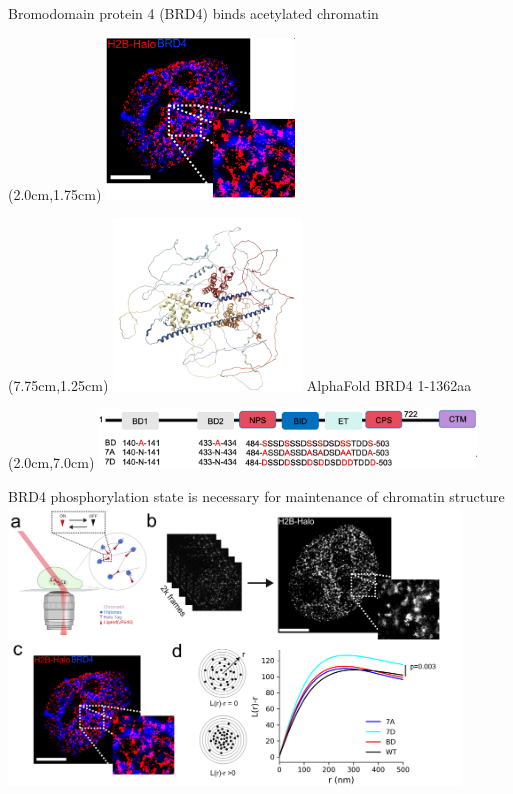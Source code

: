 \documentclass{beamer}					%
\begin{document}
\begin{frame}{Bromodomain protein 4 (BRD4) binds acetylated chromatin}

\begin{textblock*}{5cm}(2.0cm,1.75cm)
\includegraphics[width=5cm]{media/TwoColor}
\end{textblock*}

\begin{textblock*}{5cm}(7.75cm,1.25cm)
\includegraphics[width=5cm]{media/BRD4-Structure}
\;\; AlphaFold BRD4 1-1362aa 
\end{textblock*}

\begin{textblock*}{10cm}(2.0cm,7.0cm)
\includegraphics[width=10cm]{media/Mutations}
\end{textblock*}

\end{frame}


\begin{frame}{BRD4 phosphorylation state is necessary for maintenance of chromatin structure}
\includegraphics[width=12cm]{media/BRD4-STORM}
\end{frame}
\end{document}
